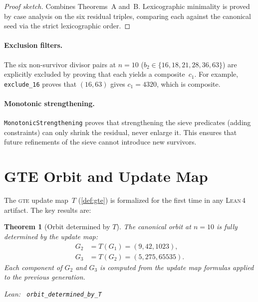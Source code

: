 \documentclass[11pt,a4paper]{article}
\newenvironment{leanref}%
  {\par\smallskip\noindent\begingroup\raggedright\textup{Lean:}~}%
  {\par\endgroup}
\newtheorem{theorem}{Theorem}[section]
\theoremstyle{definition}
\newcommand{\gte}{\textsc{gte}}
\newcommand{\lean}{\textsc{Lean}\,4}
\begin{document}
\begin{proof}[Proof sketch]
Combines Theorems~A and~B.  Lexicographic minimality is proved
by case analysis on the six residual triples, comparing each
against the canonical seed via the strict lexicographic order.
\end{proof}

\paragraph{Exclusion filters.}
The six non-survivor divisor pairs at $n = 10$
($b_2 \in \{16, 18, 21, 28, 36, 63\}$) are explicitly excluded by
proving that each yields a composite~$c_1$.  For example,
\texttt{exclude\_16} proves that $(16, 63)$ gives $c_1 = 4320$,
which is composite.

\paragraph{Monotonic strengthening.}
\texttt{MonotonicStrengthening} proves that strengthening the sieve
predicates (adding constraints) can only shrink the residual, never
enlarge it.  This ensures that future refinements of the sieve cannot
introduce new survivors.

\section{GTE Orbit and Update Map}\label{sec:gte}

The \gte{} update map~$T$ (\cref{def:gte}) is formalized for the first
time in any \lean{} artifact.  The key results are:

\begin{theorem}[Orbit determined by $T$]\label{thm:orbit-T}
The canonical orbit at $n = 10$ is fully determined by the update map:
\begin{align*}
  G_2 &= T(G_1) = (9, 42, 1023), \\
  G_3 &= T(G_2) = (5, 275, 65535).
\end{align*}
Each component of $G_2$ and $G_3$ is computed from the update map
formulas applied to the previous generation.

\begin{leanref} \lstinline|orbit_determined_by_T|
\end{leanref}
\end{theorem}
\end{document}
